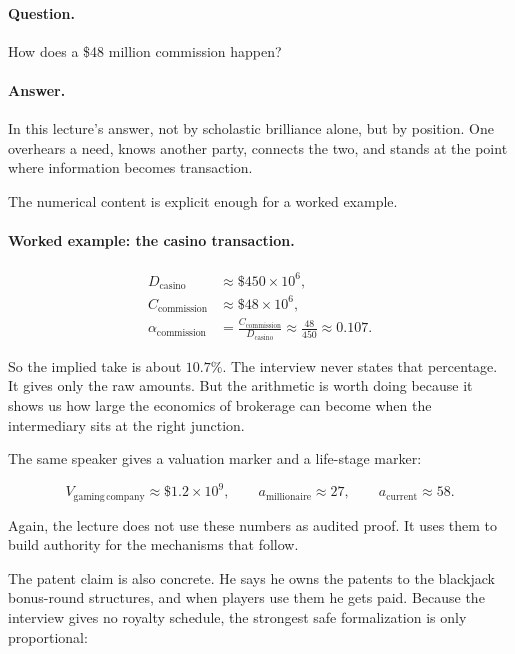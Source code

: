 \paragraph{Question.}
How does a \$48 million commission happen?

\paragraph{Answer.}
In this lecture's answer, not by scholastic brilliance alone, but by position. One overhears a need, knows another party, connects the two, and stands at the point where information becomes transaction.

The numerical content is explicit enough for a worked example.

\paragraph{Worked example: the casino transaction.}
\begin{align}
D_{\mathrm{casino}} &\approx \$450\times 10^6, \\
C_{\mathrm{commission}} &\approx \$48\times 10^6, \\
\alpha_{\mathrm{commission}}
&=
\frac{C_{\mathrm{commission}}}{D_{\mathrm{casino}}}
\approx
\frac{48}{450}
\approx
0.107.
\end{align}

So the implied take is about \(10.7\%\). The interview never states that percentage. It gives only the raw amounts. But the arithmetic is worth doing because it shows us how large the economics of brokerage can become when the intermediary sits at the right junction.

The same speaker gives a valuation marker and a life-stage marker:

\begin{equation}
V_{\mathrm{gaming\,company}} \approx \$1.2\times 10^9,
\qquad
a_{\mathrm{millionaire}} \approx 27,
\qquad
a_{\mathrm{current}} \approx 58.
\end{equation}

Again, the lecture does not use these numbers as audited proof. It uses them to build authority for the mechanisms that follow.

The patent claim is also concrete. He says he owns the patents to the blackjack bonus-round structures, and when players use them he gets paid. Because the interview gives no royalty schedule, the strongest safe formalization is only proportional:


